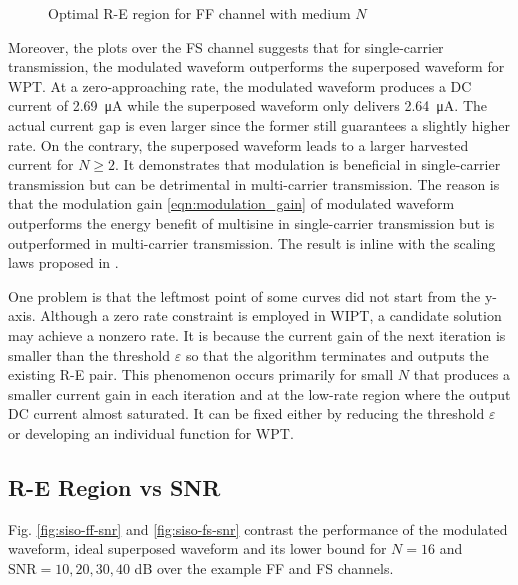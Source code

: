 \begin{figure}[ht]
  \centering
  \caption{Optimal R-E region for FF channel with medium $N$}\label{fig:siso-subband-optimal}
\end{figure}

Moreover, the plots over the FS channel suggests that for single-carrier transmission, the modulated waveform outperforms the superposed waveform for WPT. At a zero-approaching rate, the modulated waveform produces a DC current of \SI{2.69}{\uA} while the superposed waveform only delivers \SI{2.64}{\uA}. The actual current gap is even larger since the former still guarantees a slightly higher rate. On the contrary, the superposed waveform leads to a larger harvested current for $N \geqslant 2$. It demonstrates that modulation is beneficial in single-carrier transmission but can be detrimental in multi-carrier transmission. The reason is that the modulation gain \eqref{eqn:modulation_gain} of modulated waveform outperforms the energy benefit of multisine in single-carrier transmission but is outperformed in multi-carrier transmission. The result is inline with the scaling laws proposed in \cite{Clerckx2018}.

One problem is that the leftmost point of some curves did not start from the y-axis. Although a zero rate constraint is employed in WIPT, a candidate solution may achieve a nonzero rate. It is because the current gain of the next iteration is smaller than the threshold $\varepsilon$ so that the algorithm terminates and outputs the existing R-E pair. This phenomenon occurs primarily for small $N$ that produces a smaller current gain in each iteration and at the low-rate region where the output DC current almost saturated. It can be fixed either by reducing the threshold $\varepsilon$ or developing an individual function for WPT.



\subsection{R-E Region vs SNR}\label{sec:re-region-vs-snr}
Fig. \ref{fig:siso-ff-snr} and \ref{fig:siso-fs-snr} contrast the performance of the modulated waveform, ideal superposed waveform and its lower bound for $N = 16$ and ${\text{SNR}} = 10,20,30,40$ dB over the example FF and FS channels.

